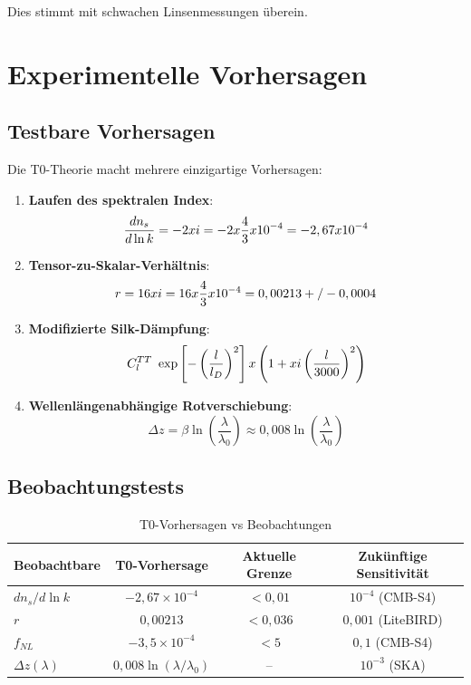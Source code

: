 \documentclass[12pt,a4paper]{article}
\begin{document}
	Dies stimmt mit schwachen Linsenmessungen überein.
	
	\section{Experimentelle Vorhersagen}
	\label{sec:predictions}
	
	\subsection{Testbare Vorhersagen}
	
	Die T0-Theorie macht mehrere einzigartige Vorhersagen:
	
	\begin{enumerate}
		\item \textbf{Laufen des spektralen Index}:
		\begin{equation}
			\frac{dn_s}{d\ln k} = -2xi = -2 x \frac{4}{3} x 10^{-4} = -2,67 x 10^{-4}
		\end{equation}
		
		\item \textbf{Tensor-zu-Skalar-Verhältnis}:
		\begin{equation}
			r = 16xi = 16 x \frac{4}{3} x 10^{-4} = 0,00213 +/- 0,0004
		\end{equation}
		
		\item \textbf{Modifizierte Silk-Dämpfung}:
		\begin{equation}
			C_l^{TT} ~ \exp\left[-\left(\frac{l}{l_D}\right)^2\right] x \left(1 + xi \left(\frac{l}{3000}\right)^2\right)
		\end{equation}
		
		\item \textbf{Wellenlängenabhängige Rotverschiebung}:
		\begin{equation}
			\Delta z = \beta \ln\left(\frac{\lambda}{\lambda_0}\right) \approx 0,008 \ln\left(\frac{\lambda}{\lambda_0}\right)
		\end{equation}
	\end{enumerate}
	
	\subsection{Beobachtungstests}
	
	\begin{table}[htbp]
		\centering
		\caption{T0-Vorhersagen vs Beobachtungen}
		\begin{tabular}{lccc}
			\toprule
			Beobachtbare & T0-Vorhersage & Aktuelle Grenze & Zukünftige Sensitivität \\
			\midrule
			$dn_s/d\ln k$ & $-2,67 \times 10^{-4}$ & $< 0,01$ & $10^{-4}$ (CMB-S4) \\
			$r$ & $0,00213$ & $< 0,036$ & $0,001$ (LiteBIRD) \\
			$f_{NL}$ & $-3,5 \times 10^{-4}$ & $< 5$ & $0,1$ (CMB-S4) \\
			$\Delta z(\lambda)$ & $0,008\ln(\lambda/\lambda_0)$ & -- & $10^{-3}$ (SKA) \\
			\bottomrule
		\end{tabular}
	\end{table}
	
\end{document}
